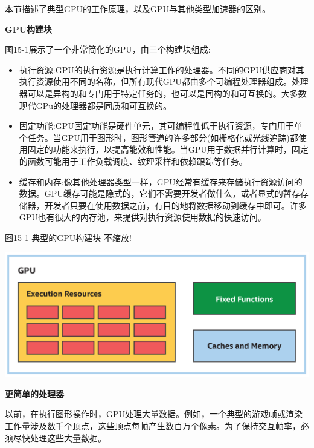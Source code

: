 本节描述了典型GPU的工作原理，以及GPU与其他类型加速器的区别。\par

\hspace*{\fill} \par %
\textbf{GPU构建块}

图15-1展示了一个非常简化的GPU，由三个构建块组成:\par

\begin{itemize}
	\item 执行资源:GPU的执行资源是执行计算工作的处理器。不同的GPU供应商对其执行资源使用不同的名称，但所有现代GPU都由多个可编程处理器组成。处理器可以是异构的和专门用于特定任务的，也可以是同构的和可互换的。大多数现代GPu的处理器都是同质和可互换的。
	\item 固定功能:GPU固定功能是硬件单元，其可编程性低于执行资源，专门用于单个任务。当GPU用于图形时，图形管道的许多部分(如栅格化或光线追踪)都使用固定的功能来执行，以提高能效和性能。当GPU用于数据并行计算时，固定的函数可能用于工作负载调度、纹理采样和依赖跟踪等任务。
	\item 缓存和内存:像其他处理器类型一样，GPU经常有缓存来存储执行资源访问的数据。GPU缓存可能是隐式的，它们不需要开发者做什么，或者显式的暂存存储器，开发者只要在使用数据之前，有目的地将数据移动到缓存中即可。许多GPU也有很大的内存池，来提供对执行资源使用数据的快速访问。
\end{itemize}

\hspace*{\fill} \par %
图15-1 典型的GPU构建块-不缩放!
\begin{center}
	\includegraphics[width=1.0\textwidth]{content/chapter-15/images/2}
\end{center}

\hspace*{\fill} \par %
\textbf{更简单的处理器}

以前，在执行图形操作时，GPU处理大量数据。例如，一个典型的游戏帧或渲染工作量涉及数千个顶点，这些顶点每帧产生数百万个像素。为了保持交互帧率，必须尽快处理这些大量数据。\par

